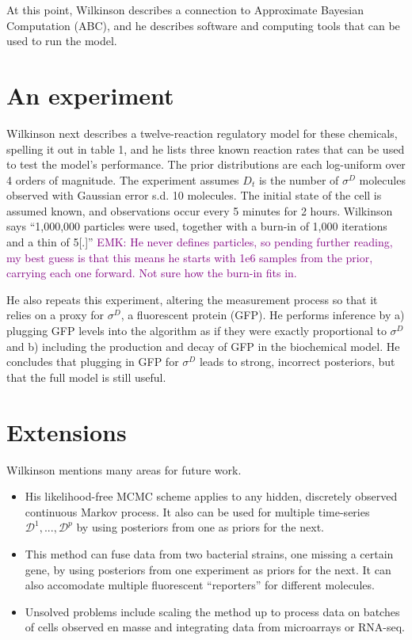 \documentclass{article}
\newcommand\EMK[1]{\textcolor{purple}{EMK: #1}}
\begin{document}

At this point, Wilkinson describes a connection to Approximate Bayesian Computation (ABC), and he describes software and computing tools that can be used to run the model. 

\section{An experiment}
Wilkinson next describes a twelve-reaction regulatory model for these chemicals, spelling it out in table 1, and he lists three known reaction rates that can be used to test the model's performance. The prior distributions are each log-uniform over 4 orders of magnitude. The experiment assumes $D_t$ is the number of $\sigma^D$ molecules observed with Gaussian error s.d. 10 molecules. The initial state of the cell is assumed known, and observations occur every 5 minutes for 2 hours. Wilkinson says ``1,000,000 particles were used, together with a burn-in of 1,000 iterations and a thin of 5[.]'' \EMK{He never defines particles, so pending further reading, my best guess is that this means he starts with 1e6 samples from the prior, carrying each one forward. Not sure how the burn-in fits in.} 

He also repeats this experiment, altering the measurement process so that it relies on a proxy for $\sigma^D$, a fluorescent protein (GFP). He performs inference by a) plugging GFP levels into the algorithm as if they were exactly proportional to $\sigma^D$ and b) including the production and decay of GFP in the biochemical model. He concludes that plugging in GFP for $\sigma^D$ leads to strong, incorrect posteriors, but that the full model is still useful.

\section{Extensions}
Wilkinson mentions many areas for future work. 
\begin{itemize}
\item His likelihood-free MCMC scheme applies to any hidden, discretely observed continuous Markov process. It also can be used for multiple time-series $\mathcal{D}^1, ..., \mathcal{D}^p$ by using posteriors from one as priors for the next.
\item This method can fuse data from two bacterial strains, one missing a certain gene, by using posteriors from one experiment as priors for the next. It can also accomodate multiple fluorescent ``reporters'' for different molecules.
\item Unsolved problems include scaling the method up to process data on batches of cells observed en masse and integrating data from microarrays or RNA-seq.
\end{itemize}
\end{document}
